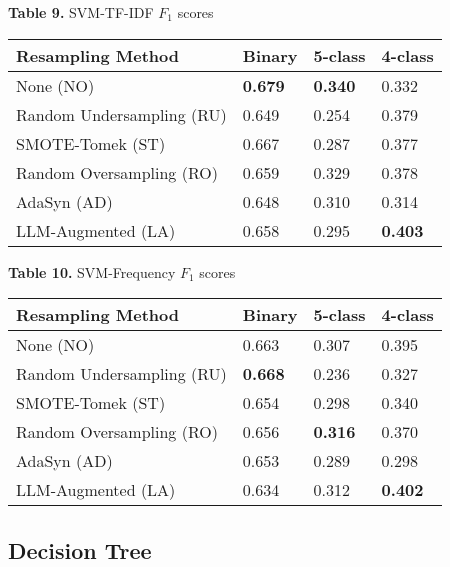 \documentclass[runningheads]{llncs}
\newenvironment{nscenter}
 {\parskip=0pt\par\nopagebreak\centering}
 {\par\noindent\ignorespacesafterend}
\begin{document}
\begin{nscenter}
{\bf Table 9.} SVM-TF-IDF $F_1$ scores\\

\begin{tabular}{|l|l|l|l|}
\hline
Resampling Method & Binary & 5-class & 4-class \\\hline
None (NO) & {\bf 0.679} & {\bf 0.340} & 0.332 \\\hline
Random Undersampling (RU) & 0.649 & 0.254 & 0.379 \\\hline
SMOTE-Tomek (ST) & 0.667 & 0.287 & 0.377 \\\hline
Random Oversampling (RO) & 0.659 & 0.329 & 0.378 \\\hline
AdaSyn (AD) & 0.648 & 0.310 & 0.314 \\\hline
LLM-Augmented (LA) & 0.658 & 0.295 & {\bf 0.403} \\\hline
\end{tabular}
\end{nscenter}


\begin{nscenter}
{\bf Table 10.} SVM-Frequency $F_1$ scores\\

\begin{tabular}{|l|l|l|l|}
\hline
Resampling Method & Binary & 5-class & 4-class \\\hline
None (NO) & 0.663 & 0.307 & 0.395 \\\hline
Random Undersampling (RU) & {\bf 0.668} & 0.236 & 0.327 \\\hline
SMOTE-Tomek (ST) & 0.654 & 0.298 & 0.340 \\\hline
Random Oversampling (RO) & 0.656 & {\bf 0.316} & 0.370 \\\hline
AdaSyn (AD) & 0.653 & 0.289 & 0.298 \\\hline
LLM-Augmented (LA) & 0.634 & 0.312 & {\bf 0.402} \\\hline
\end{tabular}
\end{nscenter}

\subsection{Decision Tree}
\end{document}
